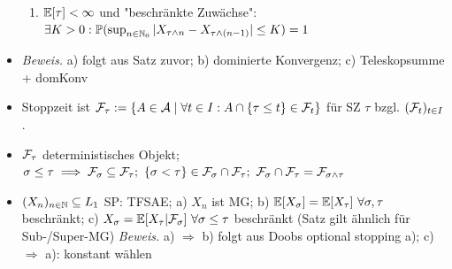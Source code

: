 \documentclass[12pt]{scrartcl}
\begin{document}
\begin{itemize}
\begin{enumerate}
			\item $\mathbb{E}[\tau]<\infty$ und "beschränkte Zuwächse": $\exists K>0:\mathbb{P}(\sup_{n\in\mathbb{N}_0}|X_{\tau\wedge n}-X_{\tau\wedge(n-1)}|\leq K)=1$
		\end{enumerate}
		\item \textit{Beweis.} a) folgt aus Satz zuvor; b) dominierte Konvergenz; c) Teleskopsumme + domKonv
		\item Stoppzeit  ist $\mathcal{F}_\tau:=\lbrace	A\in\mathcal{A}\mid\forall t\in I:A\cap\lbrace\tau\leq t\rbrace\in\mathcal{F}_t\rbrace$ für SZ $\tau$ bzgl. $(\mathcal{F}_t)_{t\in I}$.
		\item $\mathcal{F}_\tau$ deterministisches Objekt; $\sigma\leq\tau\implies\mathcal{F}_\sigma\subseteq\mathcal{F}_\tau;~\lbrace\sigma<\tau\rbrace\in\mathcal{F}_\sigma\cap\mathcal{F}_\tau;~\mathcal{F}_\sigma\cap\mathcal{F}_\tau=\mathcal{F}_{\sigma\wedge\tau}$
		\item {} $(X_n)_{n\in\mathbb{N}}\subseteq L_1$ SP: TFSAE; a) $X_n$ ist MG; b) $\mathbb{E}[X_\sigma]=\mathbb{E}[X_\tau]~\forall\sigma,\tau$ beschränkt; c) $X_\sigma=\mathbb{E}[X_\tau|\mathcal{F}_\sigma]~\forall \sigma\leq\tau$ beschränkt (Satz gilt ähnlich für Sub-/Super-MG)
		\textit{Beweis.} a) $\Rightarrow$ b) folgt aus Doobs optional stopping a); c) $\Rightarrow$ a): konstant wählen
	\end{itemize}
	
\end{document}
